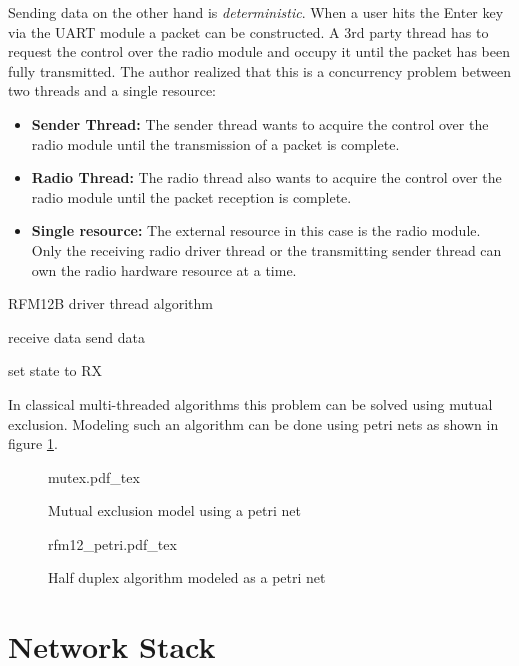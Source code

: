 Sending data on the other hand is \emph{deterministic}. When a user hits the Enter key via the UART module a packet can be constructed. A 3rd party thread has to request the control over the radio module and occupy it until the packet has been fully transmitted. The author realized that this is a concurrency problem between two threads and a single resource:
\begin{itemize}
\item \textbf{Sender Thread:} The sender thread wants to acquire the control over the radio module until the transmission of a packet is complete.
\item \textbf{Radio Thread:} The radio thread also wants to acquire the control over the radio module until the packet reception is complete.
\item \textbf{Single resource:} The external resource in this case is the radio module. Only the receiving radio driver thread or the transmitting sender thread can own the radio hardware resource at a time.
\end{itemize}

\begin{algorithm}[H]
\caption{RFM12B driver thread algorithm}
\label{alg:rfm12b_thread}
\begin{algorithmic}
        \STATE receive data
        \STATE send data
    \ENDIF 

    \STATE set state to RX
\ENDWHILE
\end{algorithmic}
\end{algorithm}

In classical multi-threaded algorithms this problem can be solved using mutual exclusion. Modeling such an algorithm can be done using petri nets as shown in figure \ref{fig:petri_mutex}.

\begin{figure}[H]
\centering
{mutex.pdf_tex}
\caption{Mutual exclusion model using a petri net}
\label{fig:petri_mutex}
\end{figure}

\begin{figure}[H]
\centering
{rfm12_petri.pdf_tex}
\caption{Half duplex algorithm modeled as a petri net}
\end{figure}

\chapter{Network Stack}

